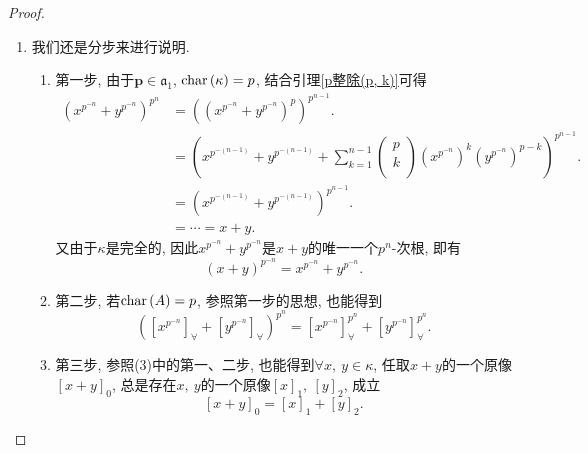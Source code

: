 \documentclass[UTF8, twoside]{ctexart}
\theoremstyle{nonumberplain}
\newtheorem{proof}{\heiti 证明}  %
\theoremstyle{nonumberplain}
\theoremstyle{plain}
\begin{document}
\begin{proof}
\begin{enumerate}
			\item 我们还是分步来进行说明.
			\vskip 0.3cm
			\begin{enumerate}
				\item 第一步, 由于$\bm{p}\in {{\mathfrak{a}}_{1}}$, $\textup{char}\left( \kappa  \right)=p$, 结合引理\ref{p整除(p, k)}可得
				\begin{align*}
					{{\left( {{x}^{{{p}^{-n}}}}+{{y}^{{{p}^{-n}}}} \right)}^{{{p}^{n}}}}&={{\left( {{\left( {{x}^{{{p}^{-n}}}}+{{y}^{{{p}^{-n}}}} \right)}^{p}} \right)}^{{{p}^{n-1}}}}. \\ 
					& ={{\left( {{x}^{{{p}^{-\left( n-1 \right)}}}}+{{y}^{{{p}^{-\left( n-1 \right)}}}}+\sum\limits_{k=1}^{n-1}{\left( \begin{matrix}
									p  \\
									k  \\
								\end{matrix} \right){{\left( {{x}^{{{p}^{-n}}}} \right)}^{k}}{{\left( {{y}^{{{p}^{-n}}}} \right)}^{p-k}}} \right)}^{{{p}^{n-1}}}}.\\
							&={{\left( {{x}^{{{p}^{-\left( n-1 \right)}}}}+{{y}^{{{p}^{-\left( n-1 \right)}}}} \right)}^{{{p}^{n-1}}}}. \\ 
					& =\cdots =x+y. 
				\end{align*}
				又由于$\kappa $是完全的, 因此${{x}^{{{p}^{-n}}}}+{{y}^{{{p}^{-n}}}}$是$x+y$的唯一一个${{p}^{n}}$-次根, 即有
				\begin{equation} \label{202103041944_1}
					{{\left( x+y \right)}^{{{p}^{-n}}}}={{x}^{{{p}^{-n}}}}+{{y}^{{{p}^{-n}}}}.
				\end{equation}
				\vskip 0.3cm
				
				\item 第二步, 若$\textup{char}\left( A \right)=p$, 参照第一步的思想, 也能得到
				\begin{equation} \label{202103041944_2}
					{{\left( {{\left[ {{x}^{{{p}^{-n}}}} \right]}_{\forall }}+{{\left[ {{y}^{{{p}^{-n}}}} \right]}_{\forall }} \right)}^{{{p}^{n}}}}=\left[ {{x}^{{{p}^{-n}}}} \right]_{\forall }^{{{p}^{n}}}+\left[ {{y}^{{{p}^{-n}}}} \right]_{\forall }^{{{p}^{n}}}.
				\end{equation}
				\vskip 0.3cm
				
				\item 第三步, 参照(3)中的第一、二步, 也能得到$\forall x,\ y\in \kappa $, 任取$x+y$的一个原像${{\left[ x+y \right]}_{0}}$, 总是存在$x,\ y$的一个原像${{\left[ x \right]}_{1}},\ {{\left[ y \right]}_{2}}$, 成立
				\begin{equation} \label{202103041944_3}
					{{\left[ x+y \right]}_{0}}={{\left[ x \right]}_{1}}+{{\left[ y \right]}_{2}}.
				\end{equation}
				\vskip 0.3cm
				

\end{enumerate}
\end{enumerate}
\end{proof}
\end{document}
